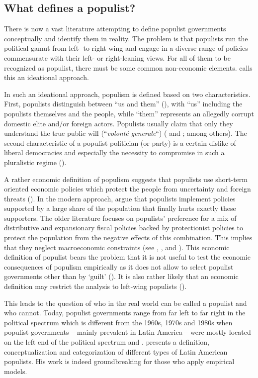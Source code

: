 \documentclass{OUP-EJ}
\begin{document}
\subsection{What defines a populist?}

There is now a vast literature attempting to define populist governments conceptually and identify them in reality. The problem is that populists run the political gamut from left- to right-wing and engage in a diverse range of policies commensurate with their left- or right-leaning views. For all of them to be recognized as populist, there must be some common non-economic elements. \cite{Kaltwasser2018} calls this an ideational approach.

In such an ideational approach, populism is defined based on two characteristics. First, populists distinguish between “us and them” (\cite{AlbertazziMcDonell2008}), with “us” including the populists themselves and the people, while “them” represents an allegedly corrupt domestic elite and/or foreign actors. Populists usually claim that only they understand the true public will (“\textit{volonté generale}“) (\cite{HouleKenny2016} and \cite{KaltwasserTaggart2015}; among others). The second characteristic of a populist politician (or party) is a certain dislike of liberal democracies and especially the necessity to compromise in such a pluralistic regime (\cite{Kaltwasser2018}).

A rather economic definition of populism suggests that populists use short-term oriented economic policies which protect the people from uncertainty and foreign threats (\cite{GuisoEtAl2017}). In the modern approach, \cite{AcemogluEtAl2013} argue that populists implement policies supported by a large share of the population that finally hurts exactly these supporters. The older literature focuses on populists’ preference for a mix of distributive and expansionary fiscal policies backed by protectionist policies to protect the population from the negative effects of this combination. This implies that they neglect macroeconomic constraints (see \cite{Sachs1989}, \cite{DornbuschEdwards1991}, \cite{Edwards2019} and \cite{GuisoEtAl2017}). This economic definition of populist bears the problem that it is not useful to test the economic consequences of populism empirically as it does not allow to select populist governments other than by ‘guilt’ (\cite{BallFreytag2019}). It is also rather likely that an economic definition may restrict the analysis to left-wing populists (\cite{Kaltwasser2018}). 

This leads to the question of who in the real world can be called a populist and who cannot. Today, populist governments range from far left to far right in the political spectrum which is different from the 1960s, 1970s and 1980s when populist governments – mainly prevalent in Latin America – were mostly located on the left end of the political spectrum \cite{Sachs1989} and \cite{DornbuschEdwards1990}. \cite{Weyland2001} presents a definition, conceptualization and categorization of different types of Latin American populists. His work is indeed groundbreaking for those who apply empirical models. 
\end{document}
